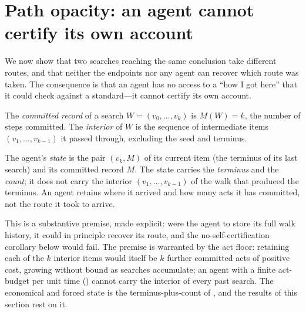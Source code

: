 \documentclass[11pt,twocolumn,a4paper]{article}
\newcommand{\Walk}{W}
\newcommand{\rec}{M}
\begin{document}
\section{Path opacity: an agent cannot certify its own account}
\label{sec:opacity}

We now show that two searches reaching the same conclusion take different
routes, and that neither the endpoints nor any agent can recover which route
was taken. The consequence is that an agent has no access to a
``how I got here'' that it could check against a standard---it cannot
certify its own account.

\begin{definition}
\label{def:record}
The \emph{committed record} of a search $\Walk=(v_0,\dots,v_k)$ is
$\rec(\Walk)=k$, the number of steps committed. The \emph{interior} of
$\Walk$ is the sequence of intermediate items $(v_1,\dots,v_{k-1})$ it
passed through, excluding the seed and terminus.
\end{definition}

\begin{definition}
\label{def:agentstate}
The agent's \emph{state} is the pair $(v_k,\rec)$ of its current item (the
terminus of its last search) and its committed record $\rec$. The state
carries the \emph{terminus} and the \emph{count}; it does not carry the
interior $(v_1,\dots,v_{k-1})$ of the walk that produced the terminus. An
agent retains where it arrived and how many acts it has committed, not the
route it took to arrive.
\end{definition}

\begin{remark}
\label{rem:state-excludes}
This is a substantive premise, made explicit: were the agent to store its
full walk history, it could in principle recover its route, and the
no-self-certification corollary below would fail. The premise is warranted
by the act floor: retaining each of the $k$ interior items would itself be
$k$ further committed acts of positive cost, growing without bound as
searches accumulate; an agent with a finite act-budget per unit time
() cannot carry the interior of every past search. The
economical and forced state is the terminus-plus-count of
, and the results of this section rest on it.
\end{remark}
\end{document}
